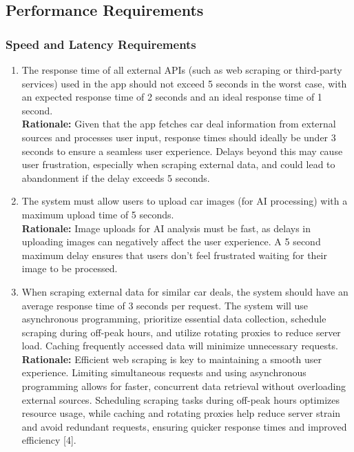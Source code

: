 \documentclass[]{article}
\begin{document}

\subsection{Performance Requirements}
\label{sub:performance_requirements}

\subsubsection{Speed and Latency Requirements}
\label{ssub:speed_and_latency_requirements}
\begin{enumerate}[{PR-SL}1.]
    \item The response time of all external APIs (such as web scraping or third-party services) used in the app should not exceed 5 seconds in the worst case, with an expected response time of 2 seconds and an ideal response time of 1 second.  \\
    \textbf{Rationale:} Given that the app fetches car deal information from external sources and processes user input, response times should ideally be under 3 seconds to ensure a seamless user experience. Delays beyond this may cause user frustration, especially when scraping external data, and could lead to abandonment if the delay exceeds 5 seconds.

    \item The system must allow users to upload car images (for AI processing) with a maximum upload time of 5 seconds.  \\
    \textbf{Rationale:} Image uploads for AI analysis must be fast, as delays in uploading images can negatively affect the user experience. A 5 second maximum delay ensures that users don't feel frustrated waiting for their image to be processed.

    \item When scraping external data for similar car deals, the system should have an average response time of 3 seconds per request. The system will use asynchronous programming, prioritize essential data collection, schedule scraping during off-peak hours, and utilize rotating proxies to reduce server load. Caching frequently accessed data will minimize unnecessary requests.  \\
    \textbf{Rationale:} Efficient web scraping is key to maintaining a smooth user experience. Limiting simultaneous requests and using asynchronous programming allows for faster, concurrent data retrieval without overloading external sources. Scheduling scraping tasks during off-peak hours optimizes resource usage, while caching and rotating proxies help reduce server strain and avoid redundant requests, ensuring quicker response times and improved efficiency [4].
\end{enumerate}
\end{document}
